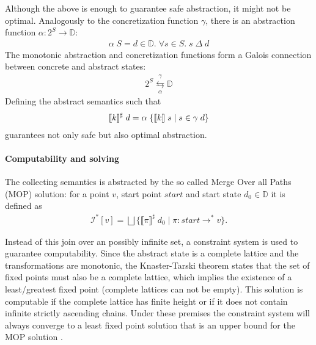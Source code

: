 Although the above is enough to guarantee safe abstraction, it might not be optimal.
Analogously to the concretization function $\gamma$, there is an abstraction function $\alpha : 2^S \to \mathbb{D}$:
\begin{align}
\alpha \; S = d \in \mathbb{D}. \; \forall s \in S. \; s \;\Delta\; d
\end{align}
The monotonic abstraction and concretization functions form a Galois connection between concrete and abstract states:
\begin{align}
2^S \overset{\gamma}{\underset{\alpha} {\leftrightarrows}} \mathbb{D}
\end{align}
Defining the abstract semantics such that
\begin{align}
\llbracket k \rrbracket^\sharp \; d = \alpha \; \{ \llbracket k \rrbracket \; s \; | \; s \in \gamma \; d\}
\end{align}
guarantees not only safe but also optimal abstraction.


\paragraph*{Computability and solving}
The collecting semantics is abstracted by the so called Merge Over all Paths (MOP) solution: for a point $v$, start point $start$ and start state $d_0 \in \mathbb{D}$ it is defined as
\begin{align}
\mathcal{I}^*[v] = \bigsqcup \{\llbracket \pi \rrbracket^\sharp \; d_0 \; | \; \pi : start \to^* v\}.
\end{align}

Instead of this join over an possibly infinite set, a constraint system is used to guarantee computability.
Since the abstract state is a complete lattice and the transformations are monotonic, the Knaster-Tarski theorem states that the set of fixed points must also be a complete lattice, which implies the existence of a least/greatest fixed point (complete lattices can not be empty).
This solution is computable if the complete lattice has finite height or if it does not contain infinite strictly ascending chains.
Under these premises the constraint system will always converge to a least fixed point solution that is an upper bound for the MOP solution \cite{kam1977monotone, Kam:1976:GDF:321921.321938}. %


